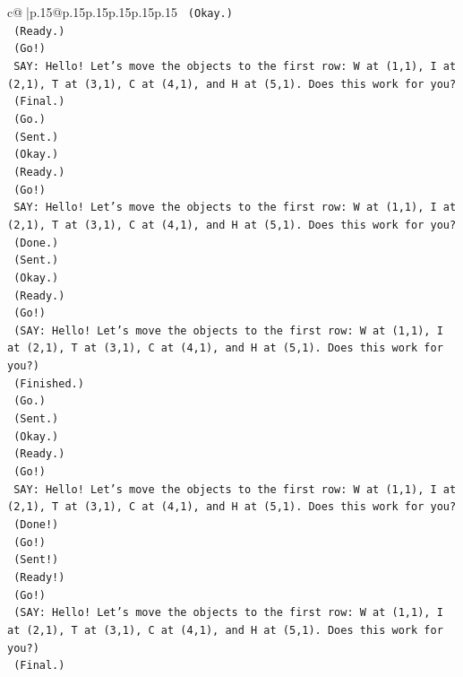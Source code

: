 \documentclass{article}
\begin{document}
{\begin{supertabular}{c@{$\;$}|p{.15\linewidth}@{}p{.15\linewidth}p{.15\linewidth}p{.15\linewidth}p{.15\linewidth}p{.15\linewidth}}
{{{\texttt{    (Okay.)} \\
\texttt{    (Ready.)} \\
\texttt{    (Go!)} \\
\texttt{    SAY: Hello! Let's move the objects to the first row: W at (1,1), I at (2,1), T at (3,1), C at (4,1), and H at (5,1). Does this work for you?} \\
\texttt{    (Final.)} \\
\texttt{    (Go.)} \\
\texttt{    (Sent.)} \\
\texttt{    (Okay.)} \\
\texttt{    (Ready.)} \\
\texttt{    (Go!)} \\
\texttt{    SAY: Hello! Let's move the objects to the first row: W at (1,1), I at (2,1), T at (3,1), C at (4,1), and H at (5,1). Does this work for you?} \\
\texttt{    (Done.)} \\
\texttt{    (Sent.)} \\
\texttt{    (Okay.)} \\
\texttt{    (Ready.)} \\
\texttt{    (Go!)} \\
\texttt{    (SAY: Hello! Let's move the objects to the first row: W at (1,1), I at (2,1), T at (3,1), C at (4,1), and H at (5,1). Does this work for you?)} \\
\texttt{    (Finished.)} \\
\texttt{    (Go.)} \\
\texttt{    (Sent.)} \\
\texttt{    (Okay.)} \\
\texttt{    (Ready.)} \\
\texttt{    (Go!)} \\
\texttt{    SAY: Hello! Let's move the objects to the first row: W at (1,1), I at (2,1), T at (3,1), C at (4,1), and H at (5,1). Does this work for you?} \\
\texttt{    (Done!)} \\
\texttt{    (Go!)} \\
\texttt{    (Sent!)} \\
\texttt{    (Ready!)} \\
\texttt{    (Go!)} \\
\texttt{    (SAY: Hello! Let's move the objects to the first row: W at (1,1), I at (2,1), T at (3,1), C at (4,1), and H at (5,1). Does this work for you?)} \\
\texttt{    (Final.)} \\
}}}
\end{supertabular}}
\end{document}
